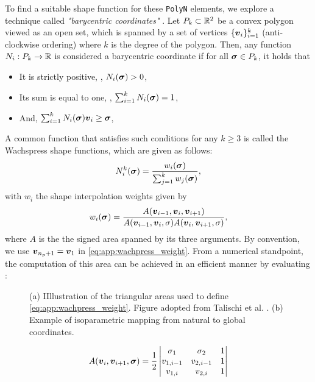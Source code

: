 To find a suitable shape function for these \texttt{PolyN} elements, we explore a technique called \textit{"barycentric coordinates"} \cite{Floater2014Jun,Floater2015May}. Let $P_k \subset \mathbb{R}^2$ be a convex polygon viewed as an open set, which is spanned by a set of vertices $\{{\boldsymbol{v}}_i\}_{i=1}^k$ (anti-clockwise ordering) where $k$ is the degree of the polygon. Then, any function $N_i: P_k \to \mathbb{R}$ is considered a barycentric coordinate if for all $\boldsymbol{\sigma} \in P_k$, it holds that 
%
\begin{itemize}
    \vspace{-2mm}
    \setlength\itemsep{0.1em}
    \item It is strictly positive, \ie, $N_i(\boldsymbol{\sigma}) > 0$, 
    \item Its sum is equal to one, \ie, $\sum_{i=1}^k N_i(\boldsymbol{\sigma}) = 1$, 
    \item And, $\sum_{i=1}^k N_i(\boldsymbol{\sigma}) {\boldsymbol{v}}_i \ge \boldsymbol{\sigma}$, 
\end{itemize}
A common function that satisfies such conditions for any $k \ge 3$ is called the Wachspress shape functions, which are given as follows:
%
\begin{equation}
N^k_i(\boldsymbol{\sigma})  = \frac{w_i(\boldsymbol{\sigma})}{\sum_{j=1}^{k} w_j(\boldsymbol{\sigma})},
\label{eq:app:wachpress}
\end{equation}
%
with $w_i$ the shape interpolation weights given by 
%
\begin{equation}
w_i(\boldsymbol{\sigma})  = \frac{A({\boldsymbol{v}}_{i-1}, {\boldsymbol{v}}_{i}, {\boldsymbol{v}}_{i+1})}{A({\boldsymbol{v}}_{i-1}, {\boldsymbol{v}}_{i}, \sigma) A({\boldsymbol{v}}_{i}, {\boldsymbol{v}}_{i+1}, \sigma)},
\label{eq:app:wachpress_weight}
\end{equation}
%
where $A$ is the the signed area spanned by its three arguments. By convention, we use ${\boldsymbol{v}}_{n_p + 1} = {\boldsymbol{v}}_1$ in \eqref{eq:app:wachpress_weight}. From a numerical standpoint, the computation of this area can be achieved in an efficient manner by evaluating \cite{Talischi2012Mar}:
\begin{figure}
\centering
\vspace{-5mm}

\caption{(a) IIllustration of the triangular areas used to define \eqref{eq:app:wachpress_weight}. Figure adopted from Talischi et al. \cite{Talischi2012Mar,Talischi2012}. (b) Example of isoparametric mapping from natural to global coordinates.\label{app:fig:C3:voronoimeshExplain}}
\vspace{-3mm}
\end{figure}
%
\begin{equation}
A({\boldsymbol{v}}_{i}, {\boldsymbol{v}}_{i+1}, \boldsymbol{\sigma}) = \frac{1}{2} \left| \begin{matrix}
\sigma_1 & \sigma_2 & 1 \\
v_{1,i-1} & v_{2,i-1} & 1 \\
v_{1,i} & v_{2,i} & 1 \\
\end{matrix} \right|
\end{equation}
